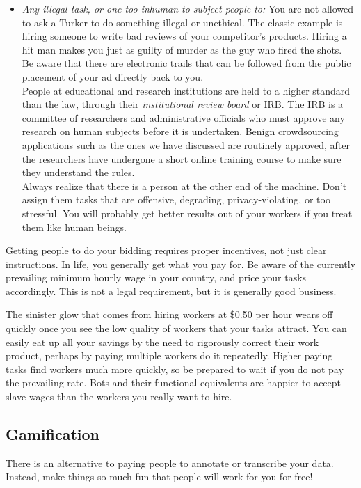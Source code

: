 \documentclass[10pt]{article}
\begin{document}
\begin{itemize}
    \item \textit{Any illegal task, or one too inhuman to subject people to:} You are not allowed to ask a Turker to do something illegal or unethical. The classic example is hiring someone to write bad reviews of your competitor's products. Hiring a hit man makes you just as guilty of murder as the guy who fired the shots. Be aware that there are electronic trails that can be followed from the public placement of your ad directly back to you.\\
          People at educational and research institutions are held to a higher standard than the law, through their \textit{institutional review board} or IRB. The IRB is a committee of researchers and administrative officials who must approve any research on human subjects before it is undertaken. Benign crowdsourcing applications such as the ones we have discussed are routinely approved, after the researchers have undergone a short online training course to make sure they understand the rules.\\
          Always realize that there is a person at the other end of the machine. Don’t assign them tasks that are offensive, degrading, privacy-violating, or too stressful. You will probably get better results out of your workers if you treat them like human beings.
\end{itemize}

Getting people to do your bidding requires proper incentives, not just clear instructions. In life, you generally get what you pay for. Be aware of the currently prevailing minimum hourly wage in your country, and price your tasks accordingly. This is not a legal requirement, but it is generally good business.

The sinister glow that comes from hiring workers at \$0.50 per hour wears off quickly once you see the low quality of workers that your tasks attract. You can easily eat up all your savings by the need to rigorously correct their work product, perhaps by paying multiple workers do it repeatedly. Higher paying tasks find workers much more quickly, so be prepared to wait if you do not pay the prevailing rate. Bots and their functional equivalents are happier to accept slave wages than the workers you really want to hire.

\subsection{Gamification}

There is an alternative to paying people to annotate or transcribe your data. Instead, make things so much fun that people will work for you for free!
\end{document}
